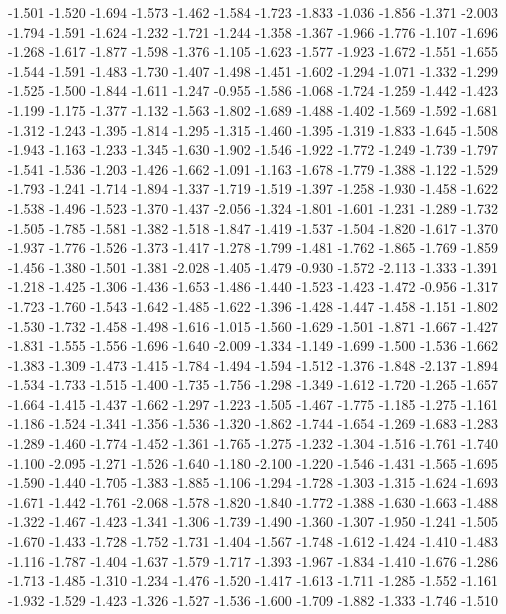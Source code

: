 \documentclass[9pt]{article}
\theoremstyle{plain}
\theoremstyle{definition}
\theoremstyle{remark}
\numberwithin{equation}{section}
\begin{document}
-1.501
-1.520
-1.694
-1.573
-1.462
-1.584
-1.723
-1.833
-1.036
-1.856
-1.371
-2.003
-1.794
-1.591
-1.624
-1.232
-1.721
-1.244
-1.358
-1.367
-1.966
-1.776
-1.107
-1.696
-1.268
-1.617
-1.877
-1.598
-1.376
-1.105
-1.623
-1.577
-1.923
-1.672
-1.551
-1.655
-1.544
-1.591
-1.483
-1.730
-1.407
-1.498
-1.451
-1.602
-1.294
-1.071
-1.332
-1.299
-1.525
-1.500
-1.844
-1.611
-1.247
-0.955
-1.586
-1.068
-1.724
-1.259
-1.442
-1.423
-1.199
-1.175
-1.377
-1.132
-1.563
-1.802
-1.689
-1.488
-1.402
-1.569
-1.592
-1.681
-1.312
-1.243
-1.395
-1.814
-1.295
-1.315
-1.460
-1.395
-1.319
-1.833
-1.645
-1.508
-1.943
-1.163
-1.233
-1.345
-1.630
-1.902
-1.546
-1.922
-1.772
-1.249
-1.739
-1.797
-1.541
-1.536
-1.203
-1.426
-1.662
-1.091
-1.163
-1.678
-1.779
-1.388
-1.122
-1.529
-1.793
-1.241
-1.714
-1.894
-1.337
-1.719
-1.519
-1.397
-1.258
-1.930
-1.458
-1.622
-1.538
-1.496
-1.523
-1.370
-1.437
-2.056
-1.324
-1.801
-1.601
-1.231
-1.289
-1.732
-1.505
-1.785
-1.581
-1.382
-1.518
-1.847
-1.419
-1.537
-1.504
-1.820
-1.617
-1.370
-1.937
-1.776
-1.526
-1.373
-1.417
-1.278
-1.799
-1.481
-1.762
-1.865
-1.769
-1.859
-1.456
-1.380
-1.501
-1.381
-2.028
-1.405
-1.479
-0.930
-1.572
-2.113
-1.333
-1.391
-1.218
-1.425
-1.306
-1.436
-1.653
-1.486
-1.440
-1.523
-1.423
-1.472
-0.956
-1.317
-1.723
-1.760
-1.543
-1.642
-1.485
-1.622
-1.396
-1.428
-1.447
-1.458
-1.151
-1.802
-1.530
-1.732
-1.458
-1.498
-1.616
-1.015
-1.560
-1.629
-1.501
-1.871
-1.667
-1.427
-1.831
-1.555
-1.556
-1.696
-1.640
-2.009
-1.334
-1.149
-1.699
-1.500
-1.536
-1.662
-1.383
-1.309
-1.473
-1.415
-1.784
-1.494
-1.594
-1.512
-1.376
-1.848
-2.137
-1.894
-1.534
-1.733
-1.515
-1.400
-1.735
-1.756
-1.298
-1.349
-1.612
-1.720
-1.265
-1.657
-1.664
-1.415
-1.437
-1.662
-1.297
-1.223
-1.505
-1.467
-1.775
-1.185
-1.275
-1.161
-1.186
-1.524
-1.341
-1.356
-1.536
-1.320
-1.862
-1.744
-1.654
-1.269
-1.683
-1.283
-1.289
-1.460
-1.774
-1.452
-1.361
-1.765
-1.275
-1.232
-1.304
-1.516
-1.761
-1.740
-1.100
-2.095
-1.271
-1.526
-1.640
-1.180
-2.100
-1.220
-1.546
-1.431
-1.565
-1.695
-1.590
-1.440
-1.705
-1.383
-1.885
-1.106
-1.294
-1.728
-1.303
-1.315
-1.624
-1.693
-1.671
-1.442
-1.761
-2.068
-1.578
-1.820
-1.840
-1.772
-1.388
-1.630
-1.663
-1.488
-1.322
-1.467
-1.423
-1.341
-1.306
-1.739
-1.490
-1.360
-1.307
-1.950
-1.241
-1.505
-1.670
-1.433
-1.728
-1.752
-1.731
-1.404
-1.567
-1.748
-1.612
-1.424
-1.410
-1.483
-1.116
-1.787
-1.404
-1.637
-1.579
-1.717
-1.393
-1.967
-1.834
-1.410
-1.676
-1.286
-1.713
-1.485
-1.310
-1.234
-1.476
-1.520
-1.417
-1.613
-1.711
-1.285
-1.552
-1.161
-1.932
-1.529
-1.423
-1.326
-1.527
-1.536
-1.600
-1.709
-1.882
-1.333
-1.746
-1.510
\end{document}

